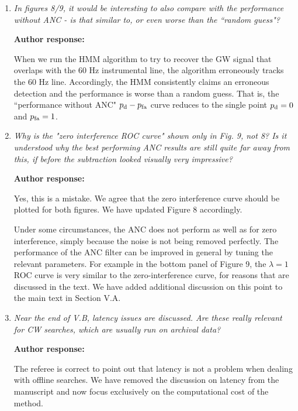 \documentclass[10pt]{article}
\begin{document}
\begin{enumerate}
		\textbf{Author response:} 



Yes, via previous work (Suvorova et al. 2016, 2017). We have now added a sentence making this point (with the associated references) in Section IV B. As noted in point 14, the Earth's Doppler effect only enters through the well-tested F-statistic, which corrects for it. It is not referenced directly by the ANC algorithm (or even the HMM, actually).


	\item \textit{In figures 8/9, it would be interesting to also compare with the performance without ANC - is that similar to, or even worse than the ``random guess"? }
	
			\textbf{Author response:} 
	
When we run the HMM algorithm to try to recover the GW signal that overlaps with the 60 Hz instrumental line, the algorithm erroneously tracks the 60 Hz line. Accordingly, the HMM consistently claims an erroneous detection and the performance is worse than a random guess. That is, the ``performance without ANC" $p_{\rm d} - p_{\rm fa}$ curve reduces to the single point $p_{\rm d} = 0$ and $p_{\rm fa}=1$. 
	
	\item \textit{Why is the "zero interference ROC curve" shown only in Fig. 9, not 8? Is it understood why the best performing ANC results are still quite far away from this, if before the subtraction looked visually very impressive? }
	
			\textbf{Author response:} 
			
	Yes, this is a mistake. We agree that the zero interference curve should be plotted for both figures. We have updated Figure 8 accordingly. 
	
	Under some circumstances, the ANC does not perform as well as for zero interference, simply because the noise is not being removed perfectly. The performance of the ANC filter can be improved in general by tuning the relevant parameters. For example in the bottom panel of Figure 9, the $\lambda=1$ ROC curve is very similar to the zero-interference curve, for reasons that are discussed in the text. We have added additional discussion on this point to the main text in Section V.A.
	
	\item \textit{Near the end of V.B, latency issues are discussed. Are these really relevant for CW searches, which are usually run on archival data?}
		
			\textbf{Author response:} 
			
	The referee is correct to point out that latency is not a problem when dealing with offline searches. We have removed the discussion on latency from the manuscript and now focus exclusively on the computational cost of the method.
	
\end{enumerate}
\end{document}
